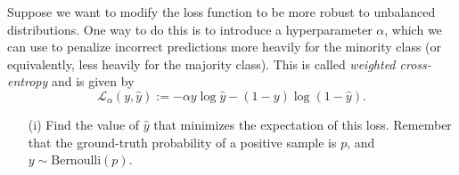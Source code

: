 \documentclass[11pt]{article}
\begin{document}
\begin{subparts}

        \newpage


        \subpart Suppose we want to modify the loss function to be more robust to unbalanced distributions. One way to do this is to introduce a hyperparameter $\alpha$, which we can use to penalize incorrect predictions more heavily for the minority class (or equivalently, less heavily for the majority class). This is called \emph{weighted cross-entropy} and is given by
        $$
        \mathcal{L}_\alpha(y, \hat{y}) := - \alpha y \log \hat{y} - (1 - y) \log (1 - \hat{y}).
        $$
        \begin{enumerate}
            \item[(i)] Find the value of $\hat{y}$ that minimizes the expectation of this loss. Remember that the ground-truth probability of a positive sample is $p$, and $y \sim \text{Bernoulli}(p)$.
            

\end{enumerate}
\end{subparts}
\end{document}
